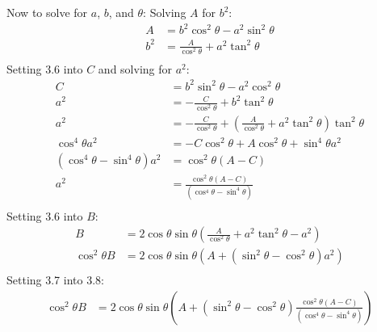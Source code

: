 Now to solve for $a$, $b$, and $\theta$:
Solving $A$ for $b^2$:
\begin{equation}
	\begin{split}
		A &= b^2 \cos^2\theta - a^2 \sin^2\theta \\
		b^2 &= \frac{A}{\cos^2\theta} + a^2\tan^2\theta \\
	\end{split}
\end{equation}
Setting 3.6 into $C$ and solving for $a^2$:
\begin{equation}
	\begin{split}
		C &= b^2 \sin^2\theta - a^2 \cos^2\theta \\
		a^2 &= -\frac{C}{\cos^2\theta} + b^2\tan^2\theta \\
		a^2 &= -\frac{C}{\cos^2\theta} + \left(\frac{A}{\cos^2\theta} + a^2\tan^2\theta\right)\tan^2\theta \\
		\cos^4\theta a^2 &= -C\cos^2\theta + A\cos^2\theta + \sin^4\theta a^2 \\
		(\cos^4\theta - \sin^4\theta) a^2  &= \cos^2\theta(A-C) \\
		a^2  &= \frac{\cos^2\theta(A-C)}{(\cos^4\theta - \sin^4\theta)} \\
	\end{split}
\end{equation}
Setting 3.6 into $B$:
\begin{equation}
	\begin{split}
		B &= 2 \cos\theta\sin\theta(\frac{A}{\cos^2\theta} + a^2\tan^2\theta - a^2) \\
		\cos^2\theta B &= 2 \cos\theta\sin\theta(A + (\sin^2\theta - \cos^2\theta) a^2) \\
	\end{split}
\end{equation}
Setting 3.7 into 3.8:
\begin{equation}
	\begin{split}
		\cos^2\theta B &= 2 \cos\theta\sin\theta(A + (\sin^2\theta - \cos^2\theta) \frac{\cos^2\theta(A-C)}{(\cos^4\theta - \sin^4\theta)}) \\
	\end{split}
\end{equation}
\fi

